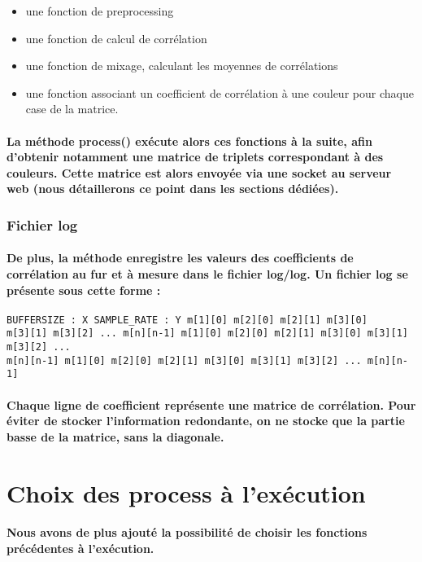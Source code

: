 \documentclass[a4paper]{article}
\begin{document}
\begin{itemize} \item une fonction de preprocessing \item une fonction de calcul
de corrélation \item une fonction de mixage, calculant les moyennes de
corrélations \item une fonction associant un coefficient de corrélation à une
couleur pour chaque case de la matrice. \end{itemize}

\paragraph{La méthode process() exécute alors ces fonctions à la suite, afin
d’obtenir notamment une matrice de triplets correspondant à des couleurs. Cette
matrice est alors envoyée via une socket au serveur web (nous détaillerons ce
point dans les sections dédiées).}

\subsubsection{Fichier log} \paragraph{De plus, la méthode enregistre les
valeurs des coefficients de corrélation au fur et à mesure dans le fichier
log/log. Un fichier log se présente sous cette forme :}

\begin{verbatim}
BUFFERSIZE : X SAMPLE_RATE : Y m[1][0] m[2][0] m[2][1] m[3][0]
m[3][1] m[3][2] ... m[n][n-1] m[1][0] m[2][0] m[2][1] m[3][0] m[3][1] m[3][2] ...
m[n][n-1] m[1][0] m[2][0] m[2][1] m[3][0] m[3][1] m[3][2] ... m[n][n-1]
\end{verbatim}

\paragraph{Chaque ligne de coefficient représente une matrice de corrélation.
Pour éviter de stocker l’information redondante, on ne stocke que la partie
basse de la matrice, sans la diagonale.}

\section{Choix des process à l'exécution} \paragraph{Nous avons de plus ajouté
la possibilité de choisir les fonctions précédentes à l’exécution.}
\end{document}
